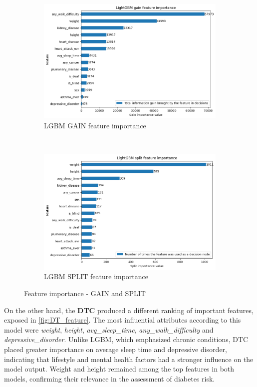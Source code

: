 \documentclass[runningheads]{llncs}
\begin{document}
\begin{figure}[htbp]
    \centering
    \begin{subfigure}[t]{0.48\textwidth}
        \centering
        \includegraphics[width=0.99\linewidth]{images/gain_fi.png}
        \caption{LGBM GAIN feature importance}
        \label{fig:lightGBM_gain_features}
    \end{subfigure}%
    ~ 
    \begin{subfigure}[t]{0.48\textwidth}
        \centering
        \includegraphics[width=0.99\linewidth]{images/split_fi.png}
        \caption{LGBM SPLIT feature importance}
        \label{fig:lightGBM_split_features}
    \end{subfigure}
    \caption{Feature importance - GAIN and SPLIT}
\end{figure}

On the other hand, the \textbf{DTC} produced a different ranking of important features, exposed in \autoref{fig:DT_feature}. The most influential attributes according to this model were \textit{weight}, \textit{height}, \textit{avg\_sleep\_time}, \textit{any\_walk\_difficulty} and \textit{depressive\_disorder}. Unlike LGBM, which emphasized chronic conditions, DTC placed greater importance on average sleep time and depressive disorder, indicating that lifestyle and mental health factors had a stronger influence on the model output. Weight and height remained among the top features in both models, confirming their relevance in the assessment of diabetes risk. 
   
\end{document}
